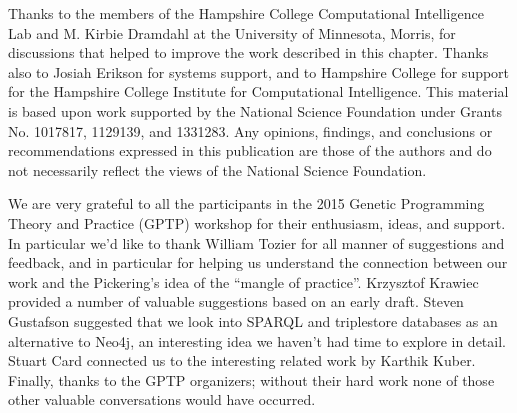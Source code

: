 \begin{acknowledgement}
	Thanks to the members of the Hampshire College Computational Intelligence Lab and M. Kirbie Dramdahl
	at the University of Minnesota, Morris, for discussions that 
	helped to improve the work described in this chapter. Thanks also to Josiah Erikson for systems support, and to 
	Hampshire College for support for the Hampshire College Institute for Computational Intelligence. 
	This material is based upon work supported by the National Science Foundation under Grants No. 1017817, 
	1129139, and 1331283. Any opinions, findings, and conclusions or recommendations expressed in this 
	publication are those of the authors and do not necessarily reflect the views of the National 
	Science Foundation.	
	
	We are very grateful to all the participants in the 2015 Genetic Programming Theory and Practice (GPTP)
	workshop for their enthusiasm, ideas, and support. In particular we'd like to thank William Tozier 
	for all manner of suggestions and feedback, and in particular for helping us understand
	the connection between our work and the Pickering's idea of the ``mangle of practice''. Krzysztof Krawiec
	provided a number of valuable suggestions based on an early draft. Steven Gustafson suggested that we
	look into SPARQL and triplestore databases as an alternative to Neo4j, an interesting idea we haven't had time to
	explore in detail. Stuart Card connected us to the interesting related work by Karthik Kuber. 
	Finally, thanks to the GPTP organizers; without their hard work none of those other valuable
	conversations would have occurred.
\end{acknowledgement}



